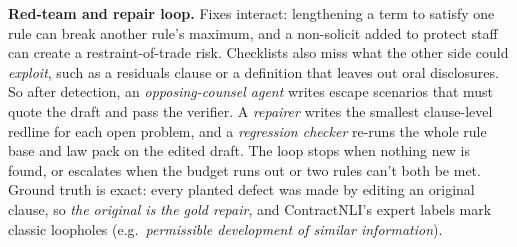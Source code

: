 \documentclass[11pt,a4paper]{article}
\begin{document}
\textbf{Red-team and repair loop.} Fixes interact: lengthening a term to satisfy one rule can break another rule's maximum, and a non-solicit added to protect staff can create a restraint-of-trade risk. Checklists also miss what the other side could \emph{exploit}, such as a residuals clause or a definition that leaves out oral disclosures. So after detection, an \emph{opposing-counsel agent} writes escape scenarios that must quote the draft and pass the verifier. A \emph{repairer} writes the smallest clause-level redline for each open problem, and a \emph{regression checker} re-runs the whole rule base and law pack on the edited draft. The loop stops when nothing new is found, or escalates when the budget runs out or two rules can't both be met. Ground truth is exact: every planted defect was made by editing an original clause, so \emph{the original is the gold repair}, and ContractNLI's expert labels mark classic loopholes (e.g.\ \emph{permissible development of similar information}).

\end{document}
